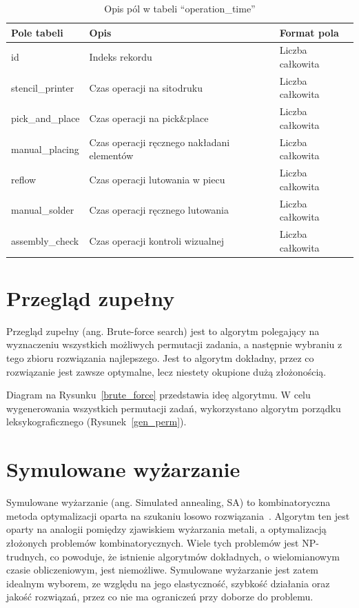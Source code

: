 \begin{table}[H]
	\centering
	\caption{Opis pól w tabeli ``operation\_time''}
	\begin{tabular}{lll}
		\toprule
		Pole tabeli      & Opis                                          & Format pola       \\
		\midrule
		id               & Indeks rekordu                                & Liczba całkowita \\
		stencil\_printer & Czas operacji na sitodruku                    & Liczba całkowita \\
		pick\_and\_place & Czas operacji na pick\&place                  & Liczba całkowita \\
		manual\_placing  & Czas operacji ręcznego nakładani elementów & Liczba całkowita \\
		reflow           & Czas operacji lutowania w piecu               & Liczba całkowita \\
		manual\_solder   & Czas operacji ręcznego lutowania             & Liczba całkowita \\
		assembly\_check  & Czas operacji kontroli wizualnej              & Liczba całkowita \\

		\bottomrule
	\end{tabular}
\end{table}

\newpage{}
\section{Przegląd zupełny}

Przegląd zupełny (ang. Brute-force search) jest to algorytm polegający na wyznaczeniu wszystkich możliwych permutacji zadania, a następnie wybraniu z tego zbioru rozwiązania najlepszego. Jest to algorytm dokładny, przez co rozwiązanie jest zawsze optymalne, lecz niestety okupione dużą złożonością.

Diagram na Rysunku~\ref{brute_force} przedstawia ideę algorytmu. W celu wygenerowania wszystkich permutacji zadań, wykorzystano algorytm porządku leksykograficznego (Rysunek~\ref{gen_perm}).

\section{Symulowane wyżarzanie}
Symulowane wyżarzanie (ang. Simulated annealing, SA) to kombinatoryczna metoda optymalizacji oparta na szukaniu losowo rozwiązania~\cite{sa}. Algorytm ten jest oparty na analogii pomiędzy zjawiskiem wyżarzania metali, a optymalizacją złożonych problemów kombinatorycznych. Wiele tych problemów jest NP-trudnych, co powoduje, że istnienie algorytmów dokładnych, o wielomianowym czasie obliczeniowym, jest niemożliwe. Symulowane wyżarzanie jest zatem idealnym wyborem, ze względu na jego elastyczność, szybkość działania oraz jakość rozwiązań, przez co nie ma ograniczeń przy doborze do problemu.

